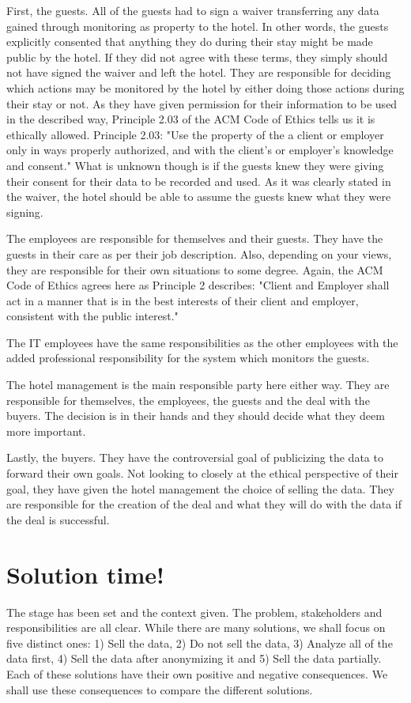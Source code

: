 First, the guests. All of the guests had to sign a waiver transferring any data gained through monitoring as property to the hotel. In other words, the guests explicitly consented that anything they do during their stay might be made public by the hotel. If they did not agree with these terms, they simply should not have signed the waiver and left the hotel. They are responsible for deciding which actions may be monitored by the hotel by either doing those actions during their stay or not. As they have given permission for their information to be used in the described way, Principle 2.03 of the ACM Code of Ethics \cite{acm_code_of_conduct} tells us it is ethically allowed. Principle 2.03: "Use the property of the a client or employer only in ways properly authorized, and with the client's or employer's knowledge and consent." What is unknown though is if the guests knew they were giving their consent for their data to be recorded and used. As it was clearly stated in the waiver, the hotel should be able to assume the guests knew what they were signing.

The employees are responsible for themselves and their guests. They have the guests in their care as per their job description. Also, depending on your views, they are responsible for their own situations to some degree. Again, the ACM Code of Ethics \cite{acm_code_of_conduct} agrees here as Principle 2 describes: "Client and Employer shall act in a manner that is in the best interests of their client and employer, consistent with the public interest."

The IT employees have the same responsibilities as the other employees with the added professional responsibility for the system which monitors the guests.

The hotel management is the main responsible party here either way. They are responsible for themselves, the employees, the guests and the deal with the buyers. The decision is in their hands and they should decide what they deem more important.

Lastly, the buyers. They have the controversial goal of publicizing the data to forward their own goals. Not looking to closely at the ethical perspective of their goal, they have given the hotel management the choice of selling the data. They are responsible for the creation of the deal and what they will do with the data if the deal is successful.
  
\section{Solution time!}
The stage has been set and the context given. The problem, stakeholders and responsibilities are all clear. While there are many solutions, we shall focus on five distinct ones: 1) Sell the data, 2) Do not sell the data, 3) Analyze all of the data first, 4) Sell the data after anonymizing it and 5) Sell the data partially. Each of these solutions have their own positive and negative consequences. We shall use these consequences to compare the different solutions.  

